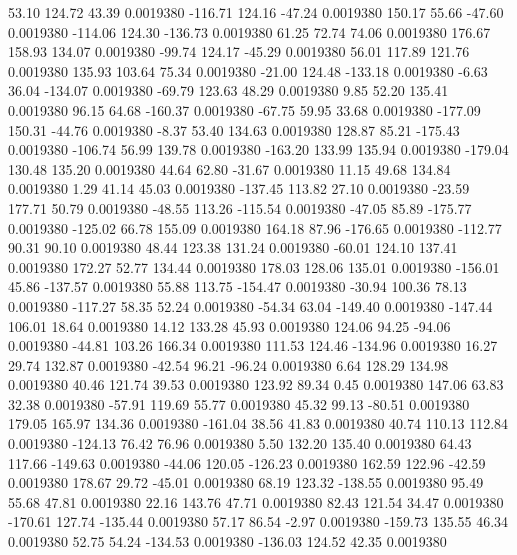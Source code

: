    53.10  124.72   43.39   0.0019380
 -116.71  124.16  -47.24   0.0019380
  150.17   55.66  -47.60   0.0019380
 -114.06  124.30 -136.73   0.0019380
   61.25   72.74   74.06   0.0019380
  176.67  158.93  134.07   0.0019380
  -99.74  124.17  -45.29   0.0019380
   56.01  117.89  121.76   0.0019380
  135.93  103.64   75.34   0.0019380
  -21.00  124.48 -133.18   0.0019380
   -6.63   36.04 -134.07   0.0019380
  -69.79  123.63   48.29   0.0019380
    9.85   52.20  135.41   0.0019380
   96.15   64.68 -160.37   0.0019380
  -67.75   59.95   33.68   0.0019380
 -177.09  150.31  -44.76   0.0019380
   -8.37   53.40  134.63   0.0019380
  128.87   85.21 -175.43   0.0019380
 -106.74   56.99  139.78   0.0019380
 -163.20  133.99  135.94   0.0019380
 -179.04  130.48  135.20   0.0019380
   44.64   62.80  -31.67   0.0019380
   11.15   49.68  134.84   0.0019380
    1.29   41.14   45.03   0.0019380
 -137.45  113.82   27.10   0.0019380
  -23.59  177.71   50.79   0.0019380
  -48.55  113.26 -115.54   0.0019380
  -47.05   85.89 -175.77   0.0019380
 -125.02   66.78  155.09   0.0019380
  164.18   87.96 -176.65   0.0019380
 -112.77   90.31   90.10   0.0019380
   48.44  123.38  131.24   0.0019380
  -60.01  124.10  137.41   0.0019380
  172.27   52.77  134.44   0.0019380
  178.03  128.06  135.01   0.0019380
 -156.01   45.86 -137.57   0.0019380
   55.88  113.75 -154.47   0.0019380
  -30.94  100.36   78.13   0.0019380
 -117.27   58.35   52.24   0.0019380
  -54.34   63.04 -149.40   0.0019380
 -147.44  106.01   18.64   0.0019380
   14.12  133.28   45.93   0.0019380
  124.06   94.25  -94.06   0.0019380
  -44.81  103.26  166.34   0.0019380
  111.53  124.46 -134.96   0.0019380
   16.27   29.74  132.87   0.0019380
  -42.54   96.21  -96.24   0.0019380
    6.64  128.29  134.98   0.0019380
   40.46  121.74   39.53   0.0019380
  123.92   89.34    0.45   0.0019380
  147.06   63.83   32.38   0.0019380
  -57.91  119.69   55.77   0.0019380
   45.32   99.13  -80.51   0.0019380
  179.05  165.97  134.36   0.0019380
 -161.04   38.56   41.83   0.0019380
   40.74  110.13  112.84   0.0019380
 -124.13   76.42   76.96   0.0019380
    5.50  132.20  135.40   0.0019380
   64.43  117.66 -149.63   0.0019380
  -44.06  120.05 -126.23   0.0019380
  162.59  122.96  -42.59   0.0019380
  178.67   29.72  -45.01   0.0019380
   68.19  123.32 -138.55   0.0019380
   95.49   55.68   47.81   0.0019380
   22.16  143.76   47.71   0.0019380
   82.43  121.54   34.47   0.0019380
 -170.61  127.74 -135.44   0.0019380
   57.17   86.54   -2.97   0.0019380
 -159.73  135.55   46.34   0.0019380
   52.75   54.24 -134.53   0.0019380
 -136.03  124.52   42.35   0.0019380
